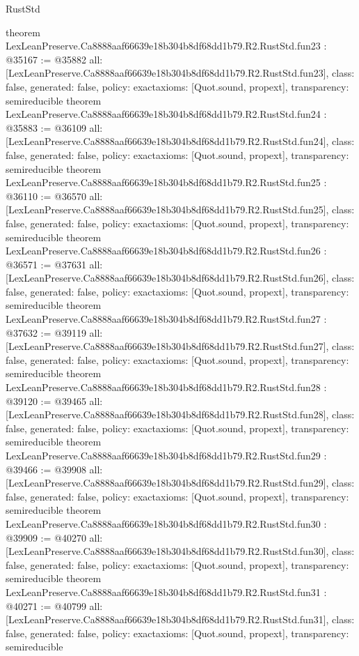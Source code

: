 \begin{lexlean}{RustStd}
\begin{coremodule}
{}
theorem LexLeanPreserve.Ca8888aaf66639e18b304b8df68dd1b79.R2.RustStd.fun23 : @35167 := @35882 {
  all: [LexLeanPreserve.Ca8888aaf66639e18b304b8df68dd1b79.R2.RustStd.fun23],
  class: false,
  generated: false,
  policy: exact{axioms: [Quot.sound, propext]},
  transparency: semireducible
}
theorem LexLeanPreserve.Ca8888aaf66639e18b304b8df68dd1b79.R2.RustStd.fun24 : @35883 := @36109 {
  all: [LexLeanPreserve.Ca8888aaf66639e18b304b8df68dd1b79.R2.RustStd.fun24],
  class: false,
  generated: false,
  policy: exact{axioms: [Quot.sound, propext]},
  transparency: semireducible
}
theorem LexLeanPreserve.Ca8888aaf66639e18b304b8df68dd1b79.R2.RustStd.fun25 : @36110 := @36570 {
  all: [LexLeanPreserve.Ca8888aaf66639e18b304b8df68dd1b79.R2.RustStd.fun25],
  class: false,
  generated: false,
  policy: exact{axioms: [Quot.sound, propext]},
  transparency: semireducible
}
theorem LexLeanPreserve.Ca8888aaf66639e18b304b8df68dd1b79.R2.RustStd.fun26 : @36571 := @37631 {
  all: [LexLeanPreserve.Ca8888aaf66639e18b304b8df68dd1b79.R2.RustStd.fun26],
  class: false,
  generated: false,
  policy: exact{axioms: [Quot.sound, propext]},
  transparency: semireducible
}
theorem LexLeanPreserve.Ca8888aaf66639e18b304b8df68dd1b79.R2.RustStd.fun27 : @37632 := @39119 {
  all: [LexLeanPreserve.Ca8888aaf66639e18b304b8df68dd1b79.R2.RustStd.fun27],
  class: false,
  generated: false,
  policy: exact{axioms: [Quot.sound, propext]},
  transparency: semireducible
}
theorem LexLeanPreserve.Ca8888aaf66639e18b304b8df68dd1b79.R2.RustStd.fun28 : @39120 := @39465 {
  all: [LexLeanPreserve.Ca8888aaf66639e18b304b8df68dd1b79.R2.RustStd.fun28],
  class: false,
  generated: false,
  policy: exact{axioms: [Quot.sound, propext]},
  transparency: semireducible
}
theorem LexLeanPreserve.Ca8888aaf66639e18b304b8df68dd1b79.R2.RustStd.fun29 : @39466 := @39908 {
  all: [LexLeanPreserve.Ca8888aaf66639e18b304b8df68dd1b79.R2.RustStd.fun29],
  class: false,
  generated: false,
  policy: exact{axioms: [Quot.sound, propext]},
  transparency: semireducible
}
theorem LexLeanPreserve.Ca8888aaf66639e18b304b8df68dd1b79.R2.RustStd.fun30 : @39909 := @40270 {
  all: [LexLeanPreserve.Ca8888aaf66639e18b304b8df68dd1b79.R2.RustStd.fun30],
  class: false,
  generated: false,
  policy: exact{axioms: [Quot.sound, propext]},
  transparency: semireducible
}
theorem LexLeanPreserve.Ca8888aaf66639e18b304b8df68dd1b79.R2.RustStd.fun31 : @40271 := @40799 {
  all: [LexLeanPreserve.Ca8888aaf66639e18b304b8df68dd1b79.R2.RustStd.fun31],
  class: false,
  generated: false,
  policy: exact{axioms: [Quot.sound, propext]},
  transparency: semireducible
}
\end{coremodule}
\end{lexlean}
